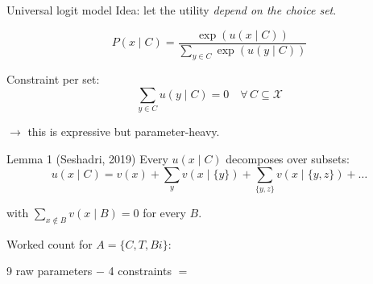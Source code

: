 \documentclass[aspectratio=169]{beamer}
\begin{document}
\begin{frame}{Universal logit model}
    Idea: let the utility \emph{depend on the choice set}.

    \begin{equation*}
        P(x \mid C) = \frac{\exp(u(x \mid C))}{\sum_{y \in C} \exp(u(y \mid C))}
    \end{equation*}

    \vspace{0.5em}

    Constraint per set:
    \begin{equation*}
        \sum_{y \in C} u(y \mid C) = 0 \quad \forall\, C \subseteq \mathcal{X}
    \end{equation*}

    \vspace{0.5em}

    $\rightarrow$ this is expressive but parameter-heavy.
\end{frame}

\begin{frame}{Lemma 1 (Seshadri, 2019)}
    Every $u(x \mid C)$ decomposes over subsets:
    \begin{equation*}
        u(x \mid C) = v(x) + \sum_{y} v(x \mid \{y\})
        + \sum_{\{y,z\}} v(x \mid \{y,z\}) + \dots
    \end{equation*}

    with $\sum_{x \notin B} v(x \mid B) = 0$ for every $B$.

    \vspace{1em}

    Worked count for $A = \{C, T, Bi\}$:
    \begin{center}
        9 raw parameters $-$ 4 constraints $=$ 
    \end{center}
\end{frame}
\end{document}
